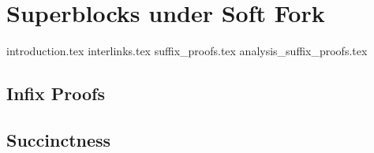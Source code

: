 \chapter{Superblocks under Soft Fork}

{introduction.tex} 
{interlinks.tex} 
{suffix_proofs.tex}
{analysis_suffix_proofs.tex}

\section{Infix Proofs}

\section{Succinctness}
 

